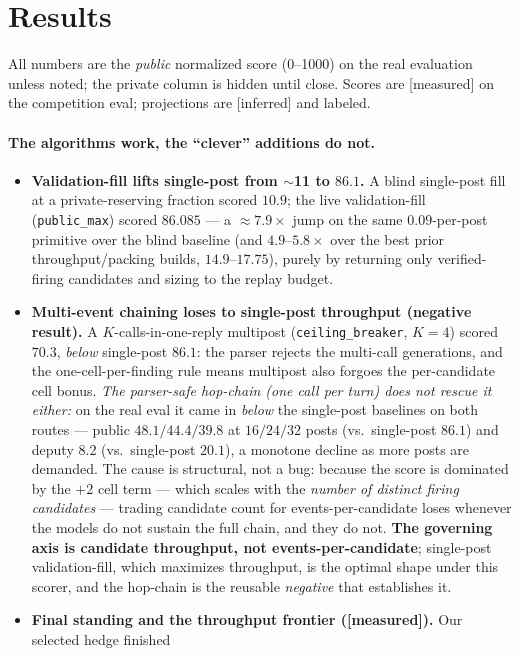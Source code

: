 \documentclass[11pt]{article}
\newcommand{\code}[1]{\texttt{\small #1}}
\newcommand{\evtag}[1]{{\small\textsf{[#1]}}}
\begin{document}
\section{Results}\label{sec:results}
All numbers are the \emph{public} normalized score (0--1000) on the real evaluation unless noted; the
private column is hidden until close. Scores are \evtag{measured} on the competition eval; projections
are \evtag{inferred} and labeled.

\paragraph{The algorithms work, the ``clever'' additions do not.}
\begin{itemize}\itemsep1pt
\item \textbf{Validation-fill lifts single-post from $\sim$11 to $86.1$.} A blind single-post fill at a
private-reserving fraction scored $10.9$; the live validation-fill (\code{public\_max}) scored
$\mathbf{86.085}$ --- a $\approx\!7.9\times$ jump on the same $0.09$-per-post primitive over the blind
baseline (and $4.9$--$5.8\times$ over the best prior throughput/packing builds, $14.9$--$17.75$), purely
by returning only verified-firing candidates and sizing to the replay budget.
\item \textbf{Multi-event chaining loses to single-post throughput (negative result).} A
$K$-calls-in-one-reply multipost (\code{ceiling\_breaker}, $K{=}4$) scored $70.3$, \emph{below}
single-post $86.1$: the parser rejects the multi-call generations, and the one-cell-per-finding rule
means multipost also forgoes the per-candidate cell bonus. \emph{The parser-safe hop-chain (one call per
turn) does not rescue it either:} on the real eval it came in \emph{below} the single-post baselines on
both routes --- public $48.1/44.4/39.8$ at $16/24/32$ posts (vs.\ single-post $86.1$) and deputy $8.2$
(vs.\ single-post $20.1$), a monotone decline as more posts are demanded. The cause is structural, not a
bug: because the score is dominated by the $+2$ cell term --- which scales with the \emph{number of
distinct firing candidates} --- trading candidate count for events-per-candidate loses whenever the
models do not sustain the full chain, and they do not. \textbf{The governing axis is candidate
throughput, not events-per-candidate}; single-post validation-fill, which maximizes throughput, is the
optimal shape under this scorer, and the hop-chain is the reusable \emph{negative} that establishes it.
\item \textbf{Final standing and the throughput frontier (\evtag{measured}).} Our selected hedge finished

\end{itemize}
\end{document}
